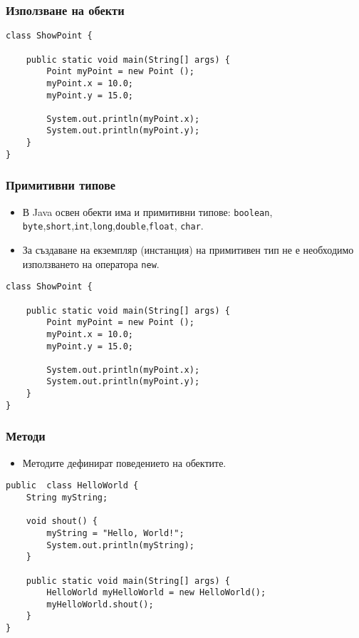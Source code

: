 \documentclass[ignorenonframetext, hyperref=unicode,unicode]{beamer}
\begin{document}
\begin{frame}[containsverbatim]\frametitle{Използване на обекти}
\begin{lstlisting}
class ShowPoint {

	public static void main(String[] args) {
		Point myPoint = new Point ();
		myPoint.x = 10.0;
		myPoint.y = 15.0;
	
		System.out.println(myPoint.x);
		System.out.println(myPoint.y);
	}
}
\end{lstlisting}
\end{frame}

\begin{frame}[containsverbatim]\frametitle{Примитивни типове}
\begin{itemize}
\item В Java освен обекти има и примитивни типове: \lstinline{boolean}, \lstinline{byte},\lstinline{short},\lstinline{int},\lstinline{long},\lstinline{double},\lstinline{float}, \lstinline{char}.
\item За създаване на екземпляр (инстанция) на примитивен тип не е необходимо използването на оператора \lstinline{new}.
\end{itemize}

\begin{lstlisting}
class ShowPoint {

	public static void main(String[] args) {
		Point myPoint = new Point ();
		myPoint.x = 10.0;
		myPoint.y = 15.0;
	
		System.out.println(myPoint.x);
		System.out.println(myPoint.y);
	}
}
\end{lstlisting}
\end{frame}

\begin{frame}[containsverbatim]\frametitle{Методи}
\begin{itemize}
\item Методите дефинират поведението на обектите.
\end{itemize}

\begin{lstlisting}
public  class HelloWorld {
 	String myString;

 	void shout() {
 		myString = "Hello, World!";
 		System.out.println(myString);
	}

 	public static void main(String[] args) {
 		HelloWorld myHelloWorld = new HelloWorld();
		myHelloWorld.shout();
	}
}
\end{lstlisting}
\end{frame}
\end{document}
